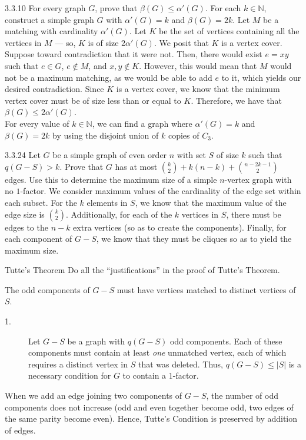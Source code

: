 \documentclass[10pt]{extarticle}
\title{}
\author{Avinash Iyer}
\date{}
\begin{document}
{
  \begin{problem}{3.3.10}
    For every graph $G$, prove that $\beta(G) \leq \alpha'(G)$. For each $k\in \mathbb{N}$, construct a simple graph $G$ with $\alpha'(G) = k$ and $\beta(G) = 2k$.
    \tcblower
    Let $M$ be a matching with cardinality $\alpha'(G)$. Let $K$ be the set of vertices containing all the vertices in $M$ --- so, $K$ is of size $2\alpha'(G)$. We posit that $K$ is a vertex cover. Suppose toward contradiction that it were not. Then, there would exist $e=xy$ such that $e\in G$, $e\notin M$, and $x,y\notin K$. However, this would mean that $M$ would not be a maximum matching, as we would be able to add $e$ to it, which yields our desired contradiction. Since $K$ is a vertex cover, we know that the minimum vertex cover must be of size less than or equal to $K$. Therefore, we have that $\beta(G) \leq 2\alpha'(G)$.\\

    For every value of $k\in \mathbb{N}$, we can find a graph where $\alpha'(G) = k$ and $\beta(G) = 2k$ by using the disjoint union of $k$ copies of $C_3$.
  \end{problem}
  \begin{problem}{3.3.24}
    Let $G$ be a simple graph of even order $n$ with set $S$ of size $k$ such that $q(G-S) > k$. Prove that $G$ has at most ${k\choose 2} + k(n-k) + {n-2k-1 \choose 2}$ edges. Use this to determine the maximum size of a simple $n$-vertex graph with no $1$-factor.
    \tcblower
    We consider maximum values of the cardinality of the edge set within each subset. For the $k$ elements in $S$, we know that the maximum value of the edge size is ${k\choose 2}$. Additionally, for each of the $k$ vertices in $S$, there must be edges to the $n-k$ extra vertices (so as to create the components). Finally, for each component of $G-S$, we know that they must be cliques so as to yield the maximum size.
  \end{problem}
  \begin{problem}{Tutte's Theorem}
    Do all the ``justifications'' in the proof of Tutte's Theorem.
    \tcblower
    \begin{description}[font=\scshape]
      \item[Necessity] The odd components of $G-S$ must have vertices matched to distinct vertices of $S$.
        \begin{description}
          \item[1.] Let $G-S$ be a graph with $q(G-S)$ odd components. Each of these components must contain at least \textit{one} unmatched vertex, each of which requires a distinct vertex in $S$ that was deleted. Thus, $q(G-S) \leq |S|$ is a necessary condition for $G$ to contain a $1$-factor.
        \end{description}
      \item[Sufficiency] When we add an edge joining two components of $G-S$, the number of odd components does not increase (odd and even together become odd, two edges of the same parity become even). Hence, Tutte's Condition is preserved by addition of edges.\\


\end{description}
\end{problem}}
\end{document}
